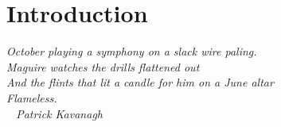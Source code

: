 \chapter{Introduction}
\textit{October playing a symphony on a slack wire paling.\\
Maguire watches the drills flattened out\\
And the flints that lit a candle for him on a June altar\\
Flameless. \\
\vspace{.5cm}
\textemdash\ <The Great Hunger> Patrick Kavanagh  } \\